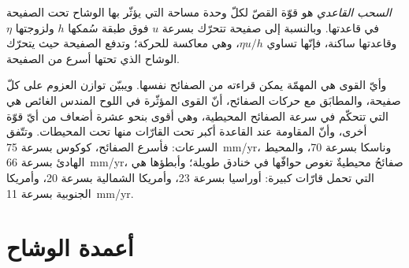 \begin{omfigure}

\par{}\label{fig:b3:mantle-convection:ridge-push}
\end{omfigure}

\begin{definition}\label{def:b3:mantle-convection:basal-drag}
\emph{السحب القاعدي} هو قوّة القصّ لكلّ وحدة مساحة التي
يؤثّر بها الوشاح تحت الصفيحة في قاعدتها. وبالنسبة إلى صفيحة تتحرّك بسرعة $u$
فوق طبقة سُمكها $h$ ولزوجتها $\eta$ وقاعدتها ساكنة، فإنّها تساوي
$\eta u/h$، وهي معاكسة للحركة؛ وتدفع الصفيحة حيث يتحرّك الوشاح الذي تحتها
أسرع من الصفيحة.
\end{definition}

وأيّ القوى هي المهمّة يمكن قراءته من الصفائح نفسها. ويبيّن توازن العزوم
على كلّ صفيحة، والمطابَق مع حركات الصفائح، أنّ القوى المؤثّرة في
اللوح المندس الغائص هي التي تتحكّم في سرعة الصفائح المحيطية، وهي أقوى بنحو عشرة أضعاف
من أيّ قوّة أخرى، وأنّ المقاومة عند القاعدة أكبر تحت القارّات منها تحت
المحيطات. وتتّفق السرعات: فأسرع الصفائح، كوكوس بسرعة \qty{75}{mm/yr}،
وناسكا بسرعة 70، والمحيط الهادئ بسرعة \qty{66}{mm/yr}، صفائحُ محيطيةٌ
تغوص حوافّها في خنادق طويلة؛ وأبطؤها هي التي تحمل قارّات كبيرة:
أوراسيا بسرعة 23، وأمريكا الشمالية بسرعة 20، وأمريكا الجنوبية بسرعة \qty{11}{mm/yr}.

\section{أعمدة الوشاح}

